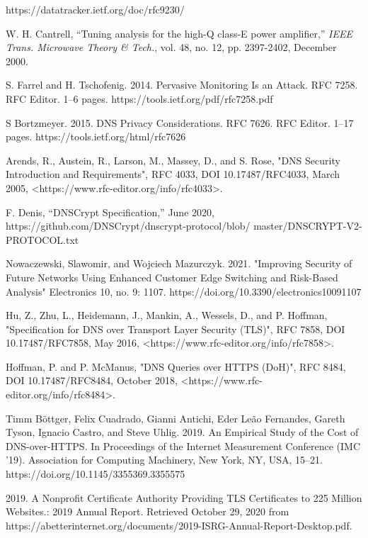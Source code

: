 \begin{thebibliography}{1}
https://datatracker.ietf.org/doc/rfc9230/

W. H. Cantrell, ``Tuning analysis for the high-Q class-E power
amplifier,'' \emph{IEEE Trans. Microwave Theory \& Tech.}, vol. 48,
no. 12, pp. 2397-2402, December 2000.

S. Farrel and H. Tschofenig. 2014. Pervasive Monitoring Is an Attack. RFC 7258.
RFC Editor. 1–6 pages. https://tools.ietf.org/pdf/rfc7258.pdf

S Bortzmeyer. 2015. DNS Privacy Considerations. RFC 7626. RFC Editor. 1–17 pages. https://tools.ietf.org/html/rfc7626

Arends, R., Austein, R., Larson, M., Massey, D., and S. Rose, "DNS Security Introduction and Requirements", RFC 4033, DOI 10.17487/RFC4033, March 2005, <https://www.rfc-editor.org/info/rfc4033>.

F. Denis, “DNSCrypt Specification,” June 2020, https://github.com/DNSCrypt/dnscrypt-protocol/blob/ master/DNSCRYPT-V2-PROTOCOL.txt

Nowaczewski, Slawomir, and Wojciech Mazurczyk. 2021. "Improving Security of Future Networks Using Enhanced Customer Edge Switching and Risk-Based Analysis" Electronics 10, no. 9: 1107. https://doi.org/10.3390/electronics10091107

Hu, Z., Zhu, L., Heidemann, J., Mankin, A., Wessels, D., and P. Hoffman, "Specification for DNS over Transport Layer Security (TLS)", RFC 7858, DOI 10.17487/RFC7858, May 2016, <https://www.rfc-editor.org/info/rfc7858>.

Hoffman, P. and P. McManus, "DNS Queries over HTTPS (DoH)", RFC 8484, DOI 10.17487/RFC8484, October 2018, <https://www.rfc-editor.org/info/rfc8484>.

Timm Böttger, Felix Cuadrado, Gianni Antichi, Eder Leão Fernandes, Gareth Tyson, Ignacio Castro, and Steve Uhlig. 2019. An Empirical Study of the Cost of DNS-over-HTTPS. In Proceedings of the Internet Measurement Conference (IMC '19). Association for Computing Machinery, New York, NY, USA, 15–21. https://doi.org/10.1145/3355369.3355575

2019. A Nonprofit Certificate Authority Providing TLS Certificates to 225 Million Websites.: 2019 Annual Report.
Retrieved October 29, 2020 from https://abetterinternet.org/documents/2019-ISRG-Annual-Report-Desktop.pdf.


\end{thebibliography}
